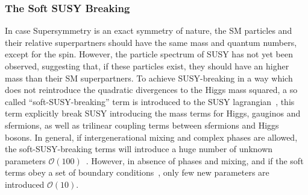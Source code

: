 \subsubsection{The Soft SUSY Breaking}
In case  Supersymmetry is an exact symmetry of nature, the SM particles and their relative superpartners should have the same mass 
and quantum numbers, except for the spin. However, the particle spectrum of SUSY has not yet been observed, suggesting that,
if  these particles exist, they  should have an higher mass than their SM superpartners. 
To achieve SUSY-breaking in a way which does not reintroduce the quadratic divergences to the Higgs mass squared, a so called ``soft-SUSY-breaking''
term is introduced to the SUSY lagrangian~\cite{softerm1,softerm2}, this term explicitly break SUSY introducing the mass terms for Higgs, gauginos and
sfermions, as well as  trilinear coupling terms between sfermions and Higgs bosons. In general, if intergenerational mixing and 
complex phases are allowed, the soft-SUSY-breaking terms will introduce a huge number of unknown parameters $\mathcal{O}(100)$~\cite{softerm3}.
However, in absence of phases and  mixing, and if the soft terms obey  a set of boundary conditions~\cite{softerm1,softerm2}, 
only few new parameters are introduced $\mathcal{O}(10)$.





